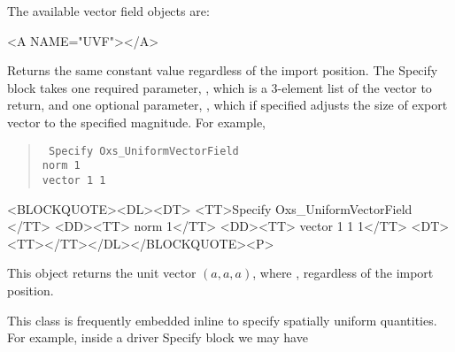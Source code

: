 \noindent
The available vector field objects are:
\begin{description}
\begin{rawhtml}<A NAME="UVF"></A>\end{rawhtml}%
%
\item[Oxs\_UniformVectorField:\label{item:UniformVectorField}]
   Returns the same constant value regardless of the import position.
   The Specify block takes one required parameter, ,
   which is a 3-element list of the vector to return, and one optional
   parameter, , which if specified adjusts the size of
   export vector to the specified magnitude.  For example,
   \begin{latexonly}
   \begin{quote}\tt
      Specify Oxs\_UniformVectorField \ocb\\
      \bi norm 1\\
      \bi vector  1 1\ccb\\
      \ccb
   \end{quote}
   \end{latexonly}
   \begin{rawhtml}<BLOCKQUOTE><DL><DT>
      <TT>Specify Oxs_UniformVectorField {</TT>
      <DD><TT> norm 1</TT>
      <DD><TT> vector {1 1 1}</TT>
   <DT><TT>}</TT></DL></BLOCKQUOTE><P>
   \end{rawhtml}
   This object returns the unit vector $(a,a,a)$, where
   , regardless of the import
   position.

   This class is frequently embedded inline to specify spatially uniform
   quantities.  For example, inside a driver Specify block we may have


\end{description}
